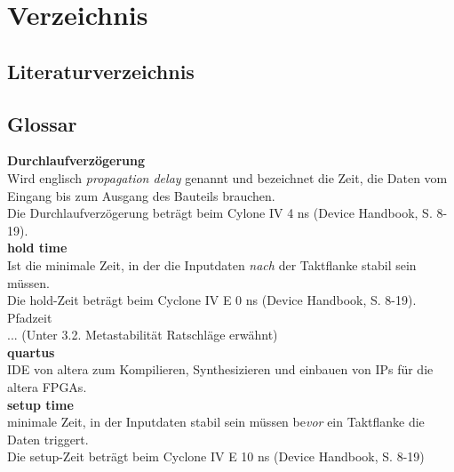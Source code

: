 
\chapter*{Verzeichnis}\label{chap.verzeichnis}

\section{Literaturverzeichnis}\label{sect.verzeichnis_literatur}

\section{Glossar}\label{sect.verzeichnis_glossar}

\textbf{Durchlaufverzögerung}\\
Wird englisch \textit{propagation delay} genannt und bezeichnet die Zeit, die Daten vom Eingang bis zum Ausgang des Bauteils brauchen.\\
Die Durchlaufverzögerung beträgt beim Cylone IV 4 ns (Device Handbook, S. 8-19).\\


\textbf{hold time}\\
Ist die minimale Zeit, in der die Inputdaten \textit{nach} der Taktflanke stabil sein müssen.\\
Die hold-Zeit beträgt beim  Cyclone IV E 0 ns (Device Handbook, S. 8-19).\\


Pfadzeit\\
... (Unter 3.2. Metastabilität Ratschläge erwähnt)\\



\textbf{quartus}\\
IDE von altera zum Kompilieren, Synthesizieren und einbauen von IPs für die altera FPGAs.\\


\textbf{setup time} \\
minimale Zeit, in der Inputdaten stabil sein müssen be\textit{vor} ein Taktflanke die Daten triggert.\\
Die setup-Zeit beträgt beim Cyclone IV E 10 ns (Device Handbook, S. 8-19)\\




